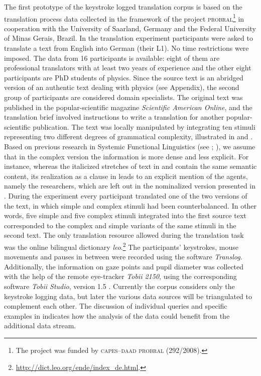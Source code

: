 \documentclass[output=paper]{LSP/langsci}
\begin{document}
The first prototype of the keystroke logged translation corpus is based on the translation process data collected in the framework of the project \textsc{probral}\footnote{The project was funded by \textsc{capes}--\textsc{daad} \textsc{probral} (292/2008).} in cooperation with the University of Saarland, Germany and the Federal University of Minas Gerais, Brazil. In the translation experiment participants were asked to translate a text from English into German (their L1). No time restrictions were imposed. The data from 16 participants is available: eight of them are professional translators with at least two years of experience and the other eight participants are PhD students of physics. Since the source text is an abridged version of an authentic text dealing with physics (see Appendix), the second group of participants are considered domain specialists. The original text was published in the popular-scientific magazine \textit{Scientific American Online}, and the translation brief involved instructions to write a translation for another popular-scientific publication. The text was locally manipulated by integrating ten stimuli representing two different degrees of grammatical complexity, illustrated in  and . Based on previous research in Systemic Functional Linguistics (see \citealt[715]{Halliday2014}; \citealt[8--10]{Taverniers2003}), we assume that in the complex version the information is more dense and less explicit. For instance, whereas the italicized stretches of text in  and  contain the same semantic content, its realization as a clause in  leads to an explicit mention of the agents, namely the researchers, which are left out in the nominalized version presented in . During the experiment every participant translated one of the two versions of the text, in which simple and complex stimuli had been counterbalanced. In other words, five simple and five complex stimuli integrated into the first source text corresponded to the complex and simple variants of the same stimuli in the second text. The only translation resource allowed during the translation task was the online bilingual dictionary \textit{leo}.\footnote{\url{http://dict.leo.org/ende/index_de.html}.} The participants’ keystrokes, mouse movements and pauses in between were recorded using the software \textit{Translog}. Additionally, the information on gaze points and pupil diameter was collected with the help of the remote eye-tracker \textit{Tobii 2150}, using the corresponding software \textit{Tobii Studio}, version 1.5 \citep{Tobii2008}. Currently the corpus considers only the keystroke logging data, but later the various data sources will be triangulated \citep[see][]{Alves2003} to complement each other. The discussion of individual queries and specific examples in  indicates how the analysis of the data could benefit from the additional data stream. 
\end{document}
